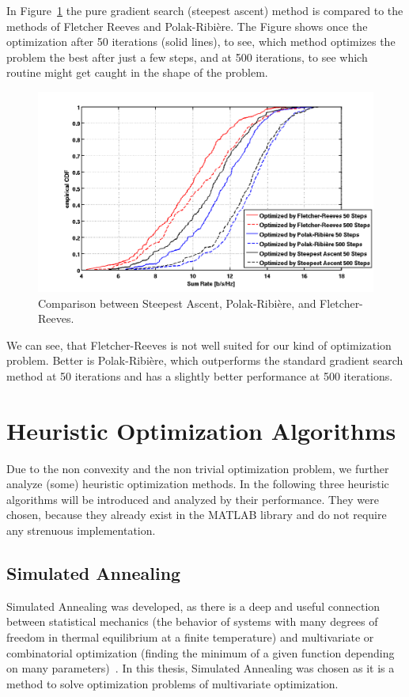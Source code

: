 In Figure~\ref{fig:pr_fr_sa} the pure gradient search (steepest ascent) method is compared to the methods of Fletcher Reeves and Polak-Ribi\`{e}re.
The Figure shows once the optimization after 50 iterations (solid lines), to see, which method optimizes the problem the best after just a few steps, and at 500 iterations, to see which routine might get caught in the shape  of the problem.
\begin{figure}[h]
\centering
  \includegraphics[width=0.85\linewidth]{images/Conjgradcomparison_edited.png}
\caption{Comparison between Steepest Ascent, Polak-Ribi\`{e}re, and Fletcher-Reeves.}
\label{fig:pr_fr_sa}
\end{figure}

We can see, that Fletcher-Reeves is not well suited for our kind of optimization problem.
Better is Polak-Ribi\`{e}re, which outperforms the standard gradient search method at 50 iterations and has a slightly better performance at 500 iterations.


\section{Heuristic Optimization Algorithms}
\label{sec:heuristic}

Due to the non convexity and the non trivial optimization problem, we further analyze (some) heuristic optimization methods.
In the following three heuristic algorithms will be introduced and analyzed by their performance.
They were chosen, because they already exist in the MATLAB library and do not require any strenuous implementation.

\subsection{Simulated Annealing}
\label{sec:sim_annealing}

Simulated Annealing was developed, as there is a deep and useful connection between statistical mechanics (the behavior of systems with many degrees of freedom in thermal equilibrium at a finite temperature) and multivariate or combinatorial optimization (finding the minimum of a given function depending on many parameters)~\cite{Kirkpatrick83}.
In this thesis, Simulated Annealing was chosen as it is a method to solve optimization problems of multivariate optimization.

